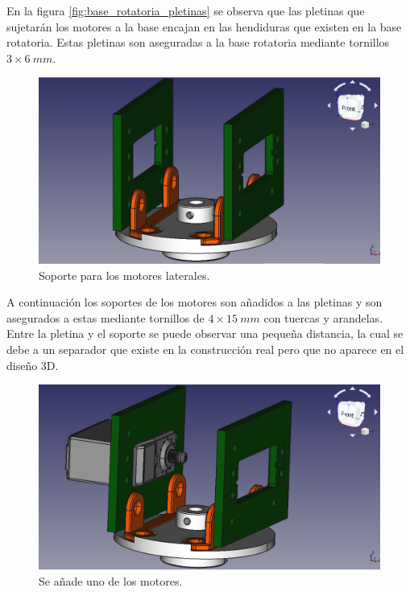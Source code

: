 En la figura \ref{fig:base_rotatoria_pletinas} se observa que las pletinas que sujetarán los motores a la base encajan en las hendiduras que existen en la base rotatoria. Estas pletinas son aseguradas a la base rotatoria mediante tornillos $3 \times 6~mm$.

\begin{figure}[H]
    \centering 
    \includegraphics[width=1\linewidth]{pictures/BaseRotatoriaConPletinasYSoporte.png}
    \caption{Soporte para los motores laterales.}
    \label{fig:soporte_motores_laterales}
\end{figure}

A continuación los soportes de los motores son añadidos a las pletinas y son asegurados a estas mediante tornillos de $4 \times 15~mm$ con tuercas y arandelas.
Entre la pletina y el soporte se puede observar una pequeña distancia, la cual se debe a un separador que existe en la construcción real pero que no aparece en el diseño 3D.

\begin{figure}[H]
    \centering 
    \includegraphics[width=1\linewidth]{pictures/BaseRotatoriaConUnMotor.png}
    \caption{Se añade uno de los motores.}
    \label{fig:un_motor_añadido}
\end{figure}

